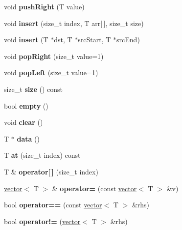 \begin{DoxyCompactItemize}
void {\bfseries push\+Right} (T value)
\item 
\mbox{\label{classyanujz_1_1vector_a10bc16f91c1d549cfb2105e4ca9f4f39}} 
void {\bfseries insert} (size\+\_\+t index, T arr\mbox{[}$\,$\mbox{]}, size\+\_\+t size)
\item 
\mbox{\label{classyanujz_1_1vector_a842a2fee1debbcbfc93acfe2603789f6}} 
void {\bfseries insert} (T $\ast$dst, T $\ast$src\+Start, T $\ast$src\+End)
\item 
\mbox{\label{classyanujz_1_1vector_a2575a44b1ec73b0e9d733b25cc88d373}} 
void {\bfseries pop\+Right} (size\+\_\+t value=1)
\item 
\mbox{\label{classyanujz_1_1vector_a475cb1209615caeff951aaeb3054a9d9}} 
void {\bfseries pop\+Left} (size\+\_\+t value=1)
\item 
\mbox{\label{classyanujz_1_1vector_acadcada884c64b846e3e56920c4dbce8}} 
size\+\_\+t {\bfseries size} () const
\item 
\mbox{\label{classyanujz_1_1vector_a972426cdc2a35b7f8eb13ad8fa39b2ce}} 
bool {\bfseries empty} ()
\item 
\mbox{\label{classyanujz_1_1vector_af00bcbaec1205084ee5c62e49d7830c9}} 
void {\bfseries clear} ()
\item 
\mbox{\label{classyanujz_1_1vector_aaf13006bde6bbf9e048c0d686651c799}} 
T $\ast$ {\bfseries data} ()
\item 
\mbox{\label{classyanujz_1_1vector_a4d96fe343042e6c536848ddd929b5bae}} 
T {\bfseries at} (size\+\_\+t index) const
\item 
\mbox{\label{classyanujz_1_1vector_a57bd3e4c1ce3f46a299d72ae3b72a21c}} 
T \& {\bfseries operator\mbox{[}$\,$\mbox{]}} (size\+\_\+t index)
\item 
\mbox{\label{classyanujz_1_1vector_afb06d63c6b009adc19b3feffebe1a9f8}} 
\hyperlink{classyanujz_1_1vector}{vector}$<$ T $>$ \& {\bfseries operator=} (const \hyperlink{classyanujz_1_1vector}{vector}$<$ T $>$ \&v)
\item 
\mbox{\label{classyanujz_1_1vector_a12fd3f96a48429653425813feaa69b29}} 
bool {\bfseries operator==} (const \hyperlink{classyanujz_1_1vector}{vector}$<$ T $>$ \&rhs)
\item 
\mbox{\label{classyanujz_1_1vector_a260121ff22a82eb25d56b6ed2e9b256d}} 
bool {\bfseries operator!=} (\hyperlink{classyanujz_1_1vector}{vector}$<$ T $>$ \&rhs)
\end{DoxyCompactItemize}
